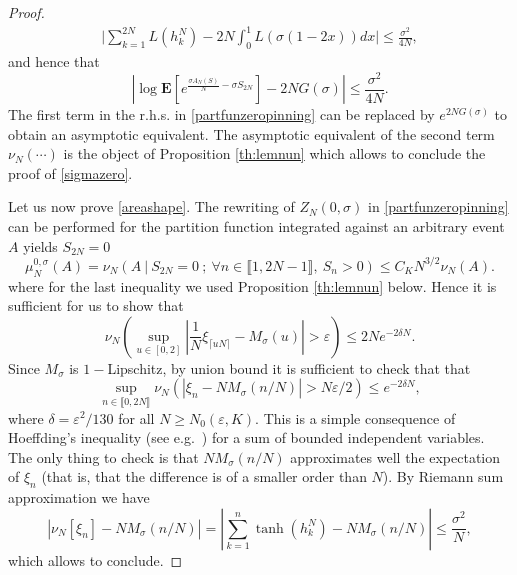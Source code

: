 \documentclass[reqno,11pt]{amsart}
\numberwithin{equation}{section}
\newcommand{\gep}{\varepsilon}       %
\newcommand{\gs}{\sigma}
\newcommand{\bE}{{\ensuremath{\mathbf E}} }
\newcommand{\lint}{\llbracket}
\newcommand{\rint}{\rrbracket}
\begin{document}
\begin{proof}
\begin{align}
 \Big\vert \sum^{2N}_{k=1} L(h^N_k)- 2N \int_0^1 L\left(\sigma(1-2x)\right)dx \Big\vert 
 \leq \frac{\sigma^2}{4N},  \label{diffapprox} 
\end{align}
 and hence that
\begin{equation}
\left|\log \bE\left[ e^{\frac{\sigma A_N(S)}{N}-\sigma S_{2N}}\right]- 2N G(\sigma)\right|\le \frac{\sigma^2}{4N}.
\end{equation}
The first term in the r.h.s. in \eqref{partfunzeropinning} can be replaced by $e^{2N G(\sigma)}$ to obtain an asymptotic equivalent. The asymptotic equivalent of the second term $\nu_N(\cdots)$ is the object of Proposition \ref{th:lemnun} which allows to conclude the proof of \eqref{sigmazero}.




 Let us now prove \eqref{areashape}.
The rewriting of  $Z_N(0,\sigma)$ in \eqref{partfunzeropinning}  can be performed for the partition function integrated against an arbitrary event $A$  yields $S_{2N}=0$
\begin{equation}
 \mu_N^{0,\gs}(A)= \nu_{N}\left(   A  \ | \  S_{2N}=0 \ ; \ \forall n\in \lint 1,2N-1\rint, \ S_{n}>0  \right)
 \le C_{ K} N^{3/2}\nu_{N}( A ).
\end{equation}
where for the last inequality we used Proposition \ref{th:lemnun} below.
Hence it is sufficient for us to show that 
\begin{equation}
  \nu_N\left(   \sup_{u\in[0,2]}\left| \frac{1}{N}\xi_{\lceil u N\rceil}-M_{\sigma}(u) \right|>\gep\right)\le  2Ne^{-2\delta N}.
\end{equation}
 Since $M_{\gs}$ is $1-$Lipschitz, by union bound it is sufficient to check that that 
 \begin{equation}
  \sup_{n\in \lint 0,2N \rint} \nu_N\left(  \left|\xi_{n}- N M_{\sigma}(n/N) \right|> N\gep/2\right)\le e^{-2\delta N},
 \end{equation}
 where $\delta= \gep^2/130$ for  all $N \ge N_0 (\gep, K)$.
This is a simple consequence of Hoeffding's inequality  (see e.g.\ \cite[Proposition 1.8]{pete2019probability}) for a sum of bounded  independent variables.
The only thing to check is that $N M_{\sigma}(n/N)$ approximates well the expectation of $\xi_n$ (that is, that the difference is of a smaller order than $N$).
By Riemann sum approximation we have
\begin{equation}
\left| \nu_N \left[ \xi_n \right]-N M_{\sigma}(n/N) \right|=  \left|\sum_{k=1}^n  \tanh (h^N_k) -N M_{\sigma}(n/N) \right|\le \frac{\sigma^2}{N},
\end{equation}
which allows to conclude.




\end{proof}
\end{document}
